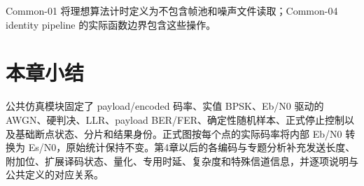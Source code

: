 Common-01 将理想算法计时定义为不包含帧池和噪声文件读取；Common-04 identity pipeline 的实际函数边界包含这些操作。

\section{本章小结}

公共仿真模块固定了 payload/encoded 码率、实值 BPSK、Eb/N0 驱动的 AWGN、硬判决、LLR、payload BER/FER、确定性随机样本、正式停止控制以及基础断点状态、分片和结果身份。正式图按每个点的实际码率将内部 Eb/N0 转换为 Es/N0，原始统计保持不变。第4章以后的各编码与专题分析补充发送长度、附加位、扩展译码状态、量化、专用时延、复杂度和特殊信道信息，并逐项说明与公共定义的对应关系。
